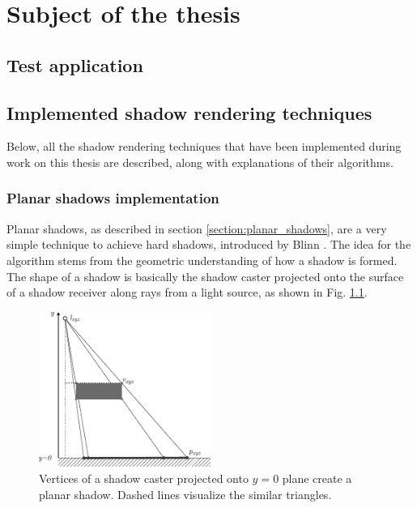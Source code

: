 \chapter{Subject of the thesis}
\label{chapter:3_subject}

\section{Test application}

\section{Implemented shadow rendering techniques}
Below, all the shadow rendering techniques that have been implemented during work on this thesis are described, along with explanations of their algorithms.

\subsection{Planar shadows implementation}
\label{section:planar_shadows_impl}

Planar shadows, as described in section \ref{section:planar_shadows}, are a very simple technique to achieve hard shadows, introduced by Blinn \cite{bib:article:blinn_shadows}. The idea for the algorithm stems from the geometric understanding of how a shadow is formed. The shape of a shadow is basically the shadow caster projected onto the surface of a shadow receiver along rays from a light source, as shown in Fig. \ref{fig:projection_shadow}. 

\begin{figure}[h]
	\centering
	\includegraphics[width=0.5\textwidth]{./graf/projection_shadow.pdf}
	\caption{Vertices of a shadow caster projected onto \(y=0\) plane create a planar shadow. Dashed lines visualize the similar triangles.}
	\label{fig:projection_shadow}
\end{figure}

